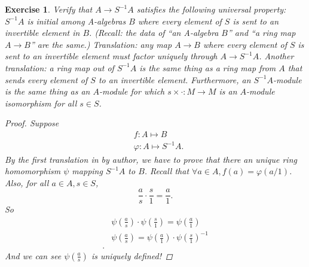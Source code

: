 \documentclass{article}
\theoremstyle{breakstyle}
\newtheorem{exercise}{Exercise}[section]
\begin{document}
\begin{exercise}
Verify that $A \rightarrow S^{-1}A$ satisfies the following universal
property: $S^{-1}A$ is initial among A-algebras $B$ where every element of
$S$ is sent to an invertible element in $B$. (Recall: the data of ``an
A-algebra $B$'' and ``a ring map $A \rightarrow B$'' are the same.)
Translation: any map $A \rightarrow B$ where every element of $S$ is sent to
an invertible element must factor uniquely through $A \rightarrow S^{-1}A$.
Another translation: a ring map out of $S^{-1}A$ is the same thing as a ring
map from $A$ that sends every element of $S$ to an invertible element.
Furthermore, an $S^{-1}A$-module is the same thing as an $A$-module for
which $s \times \cdot : M \rightarrow M$ is an $A$-module isomorphism for
all $s \in S$.

\begin{proof}
	Suppose
	\begin{align*}
		& f:A\mapsto B\\
		& \varphi :A\mapsto S^{-1}A
	.\end{align*}
    By the first translation in by author, we have to prove that there an unique
    ring homomorphism $\psi$ mapping $S^{-1}A$ to $B$. Recall that $\forall a
    \in A, f(a)=\varphi(a / 1)$. Also, for all $a\in A,s \in S$,
	$$
	\frac{a}{s}\cdot \frac{s}{1}= \frac{a}{1}
	.$$ 
	So
	\begin{align*}
		& \psi( \frac{a}{s} )\cdot \psi( \frac{s}{1} ) = \psi( \frac{a}{1} )\\
        & \psi( \frac{a}{s} )= \psi( \frac{a}{1} )\cdot \psi( \frac{s}{1} )^{-1}
        \\
	.\end{align*}
	And we can see $\psi( \frac{a}{s} )$ is uniquely defined!
\end{proof}

\end{exercise}
\end{document}
